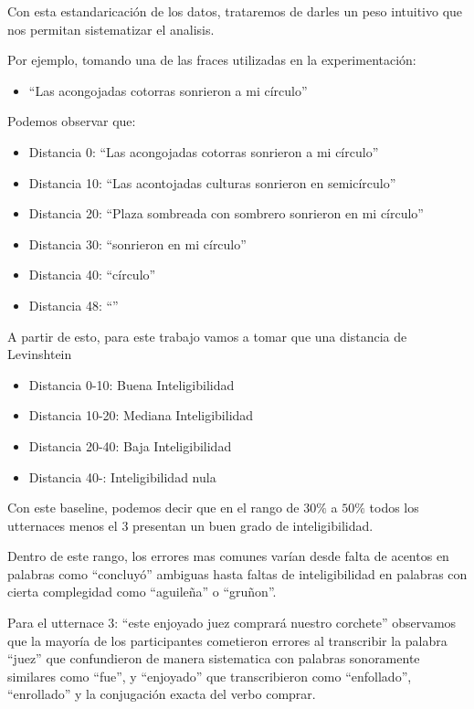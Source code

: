Con esta estandaricación de los datos, trataremos de darles un peso intuitivo que nos permitan sistematizar el analisis.

Por ejemplo, tomando una de las fraces utilizadas en la experimentación: 

\begin{itemize}
	\item ``Las acongojadas cotorras sonrieron a mi círculo''
\end{itemize}

Podemos observar que:

\begin{itemize}
	\item Distancia 0: ``Las acongojadas cotorras sonrieron a mi círculo''
	\item Distancia 10: ``Las acontojadas culturas sonrieron en semicírculo''
	\item Distancia 20: ``Plaza sombreada con sombrero sonrieron en mi círculo''
	\item Distancia 30: ``sonrieron en mi círculo''
	\item Distancia 40: ``círculo''
	\item Distancia 48: ``''
\end{itemize}

A partir de esto, para este trabajo vamos a tomar que una distancia de Levinshtein

\begin{itemize}
	\item Distancia 0-10: Buena Inteligibilidad
	\item Distancia 10-20: Mediana Inteligibilidad
	\item Distancia 20-40: Baja Inteligibilidad
	\item Distancia 40-: Inteligibilidad nula
\end{itemize}

Con este baseline, podemos decir que en el rango de $30\%$ a $50\%$ todos los utternaces menos el 3 presentan un buen grado de inteligibilidad.

Dentro de este rango, los errores mas comunes varían desde falta de acentos en palabras como ``concluyó'' ambiguas hasta faltas de inteligibilidad en palabras con cierta complegidad como ``aguileña'' o ``gruñon''.

Para el utternace 3: ``este enjoyado juez comprará nuestro corchete'' observamos que la mayoría de los participantes cometieron errores al transcribir la palabra ``juez'' que confundieron de manera sistematica con palabras sonoramente similares como ``fue'', y ``enjoyado'' que transcribieron como ``enfollado'', ``enrollado'' y la conjugación exacta del verbo comprar.

